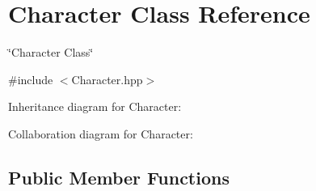 \hypertarget{classCharacter}{}\section{Character Class Reference}
\label{classCharacter}


\char`\"{}\+Character Class\char`\"{}  




{\ttfamily \#include $<$Character.\+hpp$>$}



Inheritance diagram for Character\+:


Collaboration diagram for Character\+:
\subsection*{Public Member Functions}

